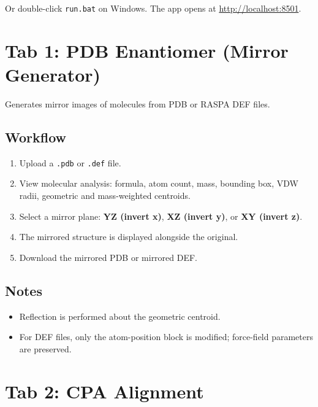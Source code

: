 \documentclass[11pt,a4paper]{article}
\begin{document}
Or double-click \texttt{run.bat} on Windows.  The app opens at
\url{http://localhost:8501}.

\section{Tab 1: PDB Enantiomer (Mirror Generator)}

Generates mirror images of molecules from PDB or RASPA DEF files.

\subsection{Workflow}

\begin{enumerate}
    \item Upload a \texttt{.pdb} or \texttt{.def} file.
    \item View molecular analysis: formula, atom count, mass,
          bounding box, VDW radii, geometric and mass-weighted centroids.
    \item Select a mirror plane: \textbf{YZ (invert x)},
          \textbf{XZ (invert y)}, or \textbf{XY (invert z)}.
    \item The mirrored structure is displayed alongside the original.
    \item Download the mirrored PDB or mirrored DEF.
\end{enumerate}

\subsection{Notes}

\begin{itemize}
    \item Reflection is performed about the geometric centroid.
    \item For DEF files, only the atom-position block is modified;
          force-field parameters are preserved.
\end{itemize}

\section{Tab 2: CPA Alignment}
\end{document}

